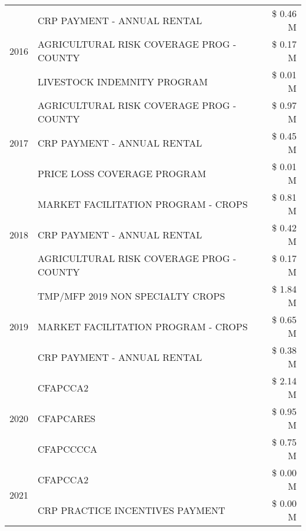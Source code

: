\begin{tabular}{llr}
\multirow[t]{3}{*}{2016} & CRP PAYMENT - ANNUAL RENTAL & \$ 0.46 M \\
 & AGRICULTURAL RISK COVERAGE PROG - COUNTY & \$ 0.17 M \\
 & LIVESTOCK INDEMNITY PROGRAM & \$ 0.01 M \\
\cline{1-3}
\multirow[t]{3}{*}{2017} & AGRICULTURAL RISK COVERAGE PROG - COUNTY & \$ 0.97 M \\
 & CRP PAYMENT - ANNUAL RENTAL & \$ 0.45 M \\
 & PRICE LOSS COVERAGE PROGRAM & \$ 0.01 M \\
\cline{1-3}
\multirow[t]{3}{*}{2018} & MARKET FACILITATION PROGRAM - CROPS & \$ 0.81 M \\
 & CRP PAYMENT - ANNUAL RENTAL & \$ 0.42 M \\
 & AGRICULTURAL RISK COVERAGE PROG - COUNTY & \$ 0.17 M \\
\cline{1-3}
\multirow[t]{3}{*}{2019} & TMP/MFP 2019 NON SPECIALTY CROPS & \$ 1.84 M \\
 & MARKET FACILITATION PROGRAM - CROPS & \$ 0.65 M \\
 & CRP PAYMENT - ANNUAL RENTAL & \$ 0.38 M \\
\cline{1-3}
\multirow[t]{3}{*}{2020} & CFAPCCA2 & \$ 2.14 M \\
 & CFAPCARES & \$ 0.95 M \\
 & CFAPCCCCA & \$ 0.75 M \\
\cline{1-3}
\multirow[t]{2}{*}{2021} & CFAPCCA2 & \$ 0.00 M \\
 & CRP PRACTICE INCENTIVES PAYMENT & \$ 0.00 M \\
\cline{1-3}
\bottomrule
\end{tabular}
